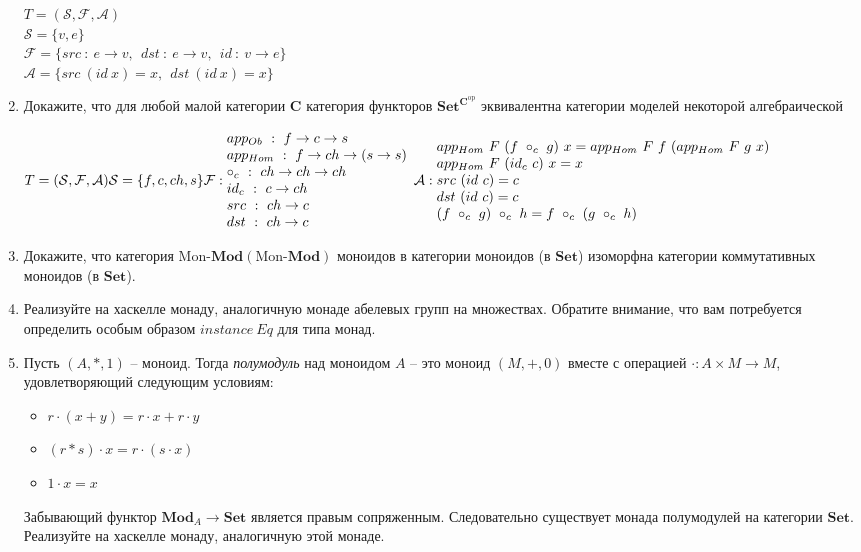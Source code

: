 \documentclass[draft]{article}
\newcommand{\cat}[1]{\mathbf{#1}}
\renewcommand{\C}{\cat{C}}
\newcommand{\Set}{\cat{Set}}
\newcommand{\fs}[1]{\mathrm{#1}}
\newcommand{\Mod}[1]{#1\text{-}\cat{Mod}}
\begin{document}
\begin{enumerate}
$T = (\mathcal{S},\mathcal{F}, \mathcal{A})$\\
$\mathcal{S} = \{v, e\}$\\
$\mathcal{F} = \{src~:~e\to v,~~dst ~:~ e \to v, ~~ id ~:~ v \to e\}$\\
$\mathcal{A} = \{ src ~(id~x) = x,~~ dst ~(id~x) = x\}$

\item Докажите, что для любой малой категории $\C$ категория функторов $\Set^{\C^\fs{op}}$ эквивалентна категории моделей некоторой алгебраической 

$
T = (\mathcal{S},\mathcal{F}, \mathcal{A})\\
\mathcal{S} = \{f, c, ch, s\}\\
\mathcal{F}:\\
\begin{matrix*}[l]
app_{Ob} ~:~  f \to c \to s\\
app_{Hom} ~:~ f \to ch \to (s \to s)\\
\circ_c ~:~ ch \to ch \to ch\\
id_c ~:~ c \to ch\\
src~:~ ch \to c\\
dst~:~ ch \to c\\
\end{matrix*}\\
\mathcal{A}:\\
\begin{matrix*}[l]
app_{Hom}~F~(f~\circ_c~g)~x = app_{Hom}~F~f~(app_{Hom}~F~g~x)\\
app_{Hom}~F~(id_c~c)~x = x\\
src~(id~c) = c\\
dst~(id~c) = c\\
(f~\circ_c~g)~\circ_c~h = f~\circ_c~(g~\circ_c~h)
\end{matrix*}
$\\


\item Докажите, что категория $\Mod{\fs{Mon}}(\Mod{\fs{Mon}})$ моноидов в категории моноидов (в $\Set$) изоморфна категории коммутативных моноидов (в $\Set$).

\item Реализуйте на хаскелле монаду, аналогичную монаде абелевых групп на множествах.
Обратите внимание, что вам потребуется определить особым образом $\mathit{instance}\ \mathit{Eq}$ для типа монад.

\item Пусть $(A,*,1)$ -- моноид.
Тогда \emph{полумодуль} над моноидом $A$ -- это моноид $(M,+,0)$ вместе с операцией $\cdot : A \times M \to M$, удовлетворяющий следующим условиям:
\begin{itemize}
\item $r \cdot (x + y) = r \cdot x + r \cdot y$
\item $(r * s) \cdot x = r \cdot (s \cdot x)$
\item $1 \cdot x = x$
\end{itemize}
Забывающий функтор $\cat{Mod}_A \to \Set$ является правым сопряженным.
Следовательно существует монада полумодулей на категории $\Set$.
Реализуйте на хаскелле монаду, аналогичную этой монаде.


\end{enumerate}
\end{document}
